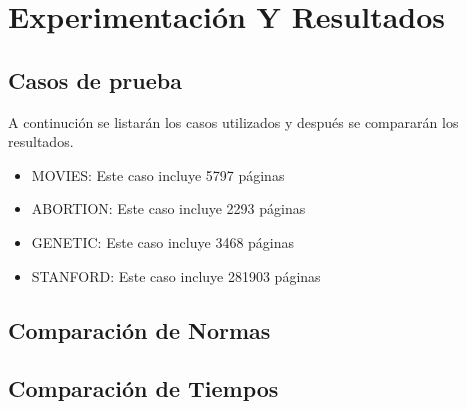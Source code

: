 \section{Experimentación Y Resultados}

\subsection{Casos de prueba}
   A continución se listarán los casos utilizados y después se compararán los resultados.

	\begin{itemize}
		\item MOVIES: Este caso incluye 5797 páginas
		\item ABORTION: Este caso incluye 2293 páginas
		\item GENETIC: Este caso incluye 3468 páginas
		\item STANFORD: Este caso incluye 281903 páginas
	\end{itemize}   

\subsection{Comparación de Normas}


\subsection{Comparación de Tiempos}
 